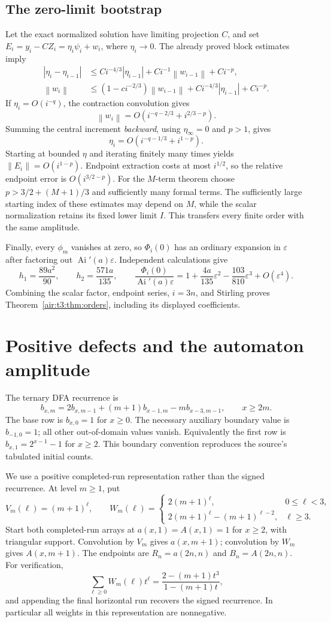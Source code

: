 \documentclass[11pt,letterpaper]{article}
\numberwithin{equation}{section}
\theoremstyle{remark}
\newcommand{\Ai}{\operatorname{Ai}}
\newcommand{\norm}[1]{\left\lVert#1\right\rVert}
\newcommand{\eps}{\varepsilon}
\begin{document}
\subsection{The zero-limit bootstrap}
Let the exact normalized solution have limiting projection $C$, and set
$E_i=y_i-CZ_i=\eta_i\psi_i+w_i$, where $\eta_i\to0$.
The already proved block estimates imply
\begin{align*}
|\eta_i-\eta_{i-1}|&\le
C i^{-4/3}|\eta_{i-1}|+C i^{-1}\norm{w_{i-1}}+C i^{-p},\\
\norm{w_i}&\le(1-ci^{-2/3})\norm{w_{i-1}}
+C i^{-4/3}|\eta_{i-1}|+C i^{-p}.
\end{align*}
If $\eta_i=O(i^{-q})$, the contraction convolution gives
\[
\norm{w_i}=O(i^{-q-2/3}+i^{2/3-p}).
\]
Summing the central increment \emph{backward}, using $\eta_\infty=0$ and $p>1$, gives
\[
\eta_i=O(i^{-q-1/3}+i^{1-p}).
\]
Starting at bounded $\eta$ and iterating finitely many times yields
$\norm{E_i}=O(i^{1-p})$. Endpoint extraction costs at most $i^{1/2}$, so the relative endpoint error is $O(i^{3/2-p})$. For the $M$-term theorem choose $p>3/2+(M+1)/3$ and sufficiently many formal terms. The sufficiently large starting index of these estimates may depend on $M$, while the scalar normalization retains its fixed lower limit $I$. This transfers every finite order with the same amplitude.

Finally, every $\phi_m$ vanishes at zero, so $\Phi_i(0)$ has an ordinary expansion in $\eps$ after factoring out $\Ai'(a)\eps$. Independent calculations give
\[
h_1=\frac{89a^2}{90},\qquad h_2=\frac{571a}{135},\qquad
\frac{\Phi_i(0)}{\Ai'(a)\eps}
=1+\frac{4a}{135}\eps^2-\frac{103}{810}\eps^3+O(\eps^4).
\]
Combining the scalar factor, endpoint series, $i=3n$, and Stirling proves Theorem~\ref{air:t3:thm:orders}, including its displayed coefficients.

\section{Positive defects and the automaton amplitude}\label{air:t3:sec:defects}
The ternary DFA recurrence is
\[
b_{x,m}=2b_{x,m-1}+(m+1)b_{x-1,m}-m b_{x-3,m-1},
\qquad x\ge2m.
\]
The base row is $b_{x,0}=1$ for $x\ge0$. The necessary auxiliary boundary value is $b_{-1,0}=1$; all other out-of-domain values vanish. Equivalently the first row is $b_{x,1}=2^{x-1}-1$ for $x\ge2$. This boundary convention reproduces the source's tabulated initial counts.

We use a positive completed-run representation rather than the signed recurrence. At level $m\ge1$, put
\[
V_m(\ell)=(m+1)^\ell,\qquad
W_m(\ell)=
\begin{cases}
2(m+1)^\ell,&0\le\ell<3,\\
2(m+1)^\ell-(m+1)^{\ell-2},&\ell\ge3.
\end{cases}
\]
Start both completed-run arrays at $a(x,1)=A(x,1)=1$ for $x\ge2$, with triangular support. Convolution by $V_m$ gives $a(x,m+1)$; convolution by $W_m$ gives $A(x,m+1)$. The endpoints are $R_n=a(2n,n)$ and $B_n=A(2n,n)$. For verification,
\[
\sum_{\ell\ge0}W_m(\ell)t^\ell
=\frac{2-(m+1)t^3}{1-(m+1)t},
\]
and appending the final horizontal run recovers the signed recurrence. In particular all weights in this representation are nonnegative.
\end{document}
